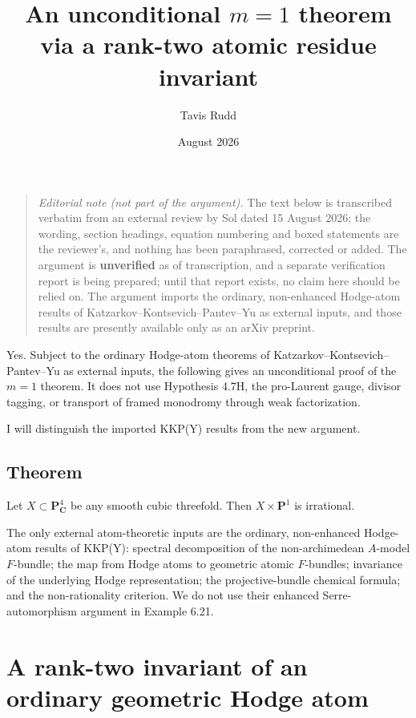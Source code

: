 \documentclass[11pt]{article}
\title{An unconditional $m=1$ theorem via a rank-two atomic residue invariant}
\author{Tavis Rudd}
\date{August 2026}
\theoremstyle{definition}
\theoremstyle{remark}
\newcommand{\C}{\mathbf C}
\newcommand{\PP}{\mathbf P}
\begin{document}
\maketitle

\begin{quote}
\emph{Editorial note (not part of the argument).} The text below is transcribed
verbatim from an external review by Sol dated 15 August 2026; the wording,
section headings, equation numbering and boxed statements are the reviewer's,
and nothing has been paraphrased, corrected or added. The argument is
\textbf{unverified} as of transcription, and a separate verification report is
being prepared; until that report exists, no claim here should be relied on.
The argument imports the ordinary, non-enhanced Hodge-atom results of
Katzarkov--Kontsevich--Pantev--Yu as external inputs, and those results are
presently available only as an arXiv preprint.
\end{quote}

\bigskip

Yes. Subject to the ordinary Hodge-atom theorems of
Katzarkov--Kontsevich--Pantev--Yu as external inputs, the following gives an
unconditional proof of the $m=1$ theorem. It does not use Hypothesis 4.7H, the
pro-Laurent gauge, divisor tagging, or transport of framed monodromy through
weak factorization.

I will distinguish the imported KKP(Y) results from the new argument.

\subsection*{Theorem}

Let $X\subset\PP^4_\C$ be any smooth cubic threefold. Then $X\times\PP^1$ is
irrational.

The only external atom-theoretic inputs are the ordinary, non-enhanced
Hodge-atom results of KKP(Y): spectral decomposition of the non-archimedean
$A$-model $F$-bundle; the map from Hodge atoms to geometric atomic $F$-bundles;
invariance of the underlying Hodge representation; the projective-bundle
chemical formula; and the non-rationality criterion. We do not use their
enhanced Serre-automorphism argument in Example 6.21.

\section{A rank-two invariant of an ordinary geometric Hodge atom}
\end{document}
